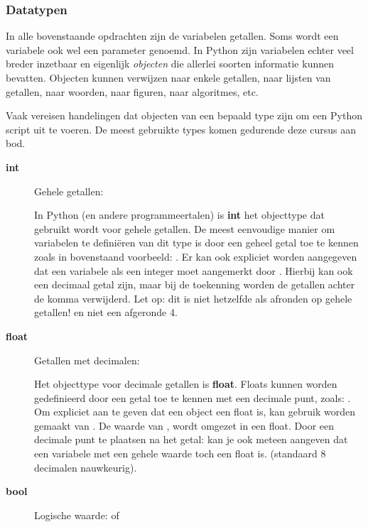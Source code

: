 \documentclass[a4paper,11pt, fleqn]{article}
\begin{document}
\subsubsection{Datatypen}
In alle bovenstaande opdrachten zijn de variabelen getallen. Soms wordt een variabele ook wel een parameter genoemd. In Python zijn variabelen echter veel breder inzetbaar en eigenlijk \textit{objecten} die allerlei soorten informatie kunnen bevatten. Objecten kunnen verwijzen naar enkele getallen, naar lijsten van getallen, naar woorden, naar figuren, naar algoritmes, etc. 

Vaak vereisen handelingen dat objecten van een bepaald type zijn om een Python script uit te voeren. De meest gebruikte types komen gedurende deze cursus aan bod. 

\begin{description}
\item[\textbf{int}] Gehele getallen: 

In Python (en andere programmeertalen) is {\bf int} het objecttype dat gebruikt wordt voor gehele getallen. De meest eenvoudige manier om variabelen te defini\"eren van dit type is door een geheel getal toe te kennen zoals in bovenstaand voorbeeld: . Er kan ook expliciet worden aangegeven dat een variabele als een integer moet aangemerkt door . Hierbij kan  ook een decimaal getal zijn, maar bij de toekenning worden de getallen achter de komma verwijderd. Let op: dit is niet hetzelfde als afronden op gehele getallen!  en niet een afgeronde 4.

\item[\textbf{float}] Getallen met decimalen: 

Het objecttype voor decimale getallen is {\bf float}. Floats kunnen worden gedefinieerd door een getal toe te kennen met een decimale punt, zoals: . Om expliciet aan te geven dat een object  een float is, kan gebruik worden gemaakt van . De waarde van , wordt omgezet in een float. Door een decimale punt te plaatsen na het getal:  kan je ook meteen aangeven dat een variabele met een gehele waarde toch een float is.  (standaard 8 decimalen nauwkeurig).

\item[\textbf{bool}] Logische waarde:  of 


\end{description}
\end{document}

